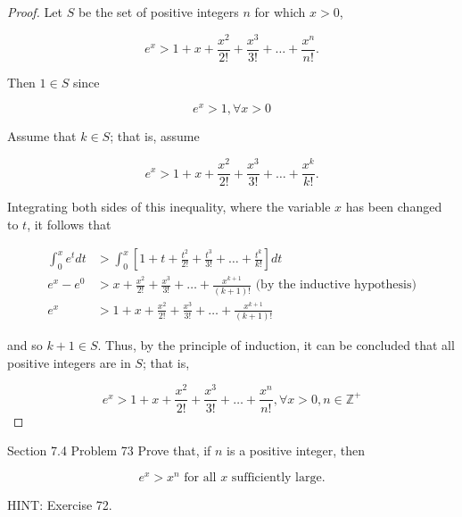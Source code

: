 \documentclass{article}
\begin{document}
    \begin{proof}
        Let $S$ be the set of positive integers $n$ for which $x>0$,

        \[
            e^x > 1 + x + \frac{x^2}{2!} + \frac{x^3}{3!} + \dots + \frac{x^n}{n!}.
        \]

        Then $1\in S$ since

        \[
            e^x > 1, \forall x > 0
        \]

        Assume that $k\in S$; that is, assume

        \[
            e^x > 1 + x + \frac{x^2}{2!} + \frac{x^3}{3!} + \dots + \frac{x^k}{k!}.
        \]

        Integrating both sides of this inequality, where the variable $x$ has been changed to $t$, it follows that

        \begin{align*}
            \int_{0}^x e^t dt   &> \int_0^x \left[1+t+\frac{t^2}{2!} + \frac{t^3}{3!} + \dots + \frac{t^k}{k!}\right]dt \\
            e^x - e^0           &> x + \frac{x^2}{2!} + \frac{x^3}{3!} + \dots + \frac{x^{k+1}}{(k+1)!} \text{ (by the inductive hypothesis)} \\
            e^x                 &> 1 + x + \frac{x^2}{2!} + \frac{x^3}{3!} + \dots + \frac{x^{k+1}}{(k+1)!}
        \end{align*}

        and so $k+1\in S$. Thus, by the principle of induction, it can be concluded that all positive integers are in $S$; that is,

        \[
            e^x > 1 + x + \frac{x^2}{2!} + \frac{x^3}{3!} + \dots + \frac{x^n}{n!}, \forall x > 0, n\in \mathbb{Z}^+
        \]
    \end{proof}

    \pagebreak
    \thispagestyle{3}


    \begin{tbhtheorem}{Section 7.4 Problem 73}
        Prove that, if $n$ is a positive integer, then

        \[
            e^x > x^n \text{ for all $x$ sufficiently large.}
        \]

        HINT: Exercise 72.
    \end{tbhtheorem}
\end{document}
